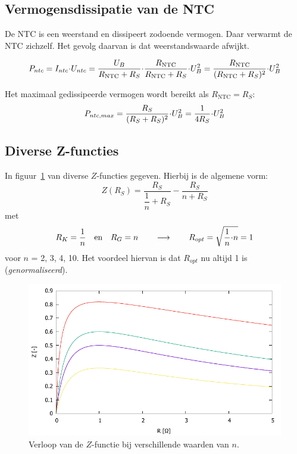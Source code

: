 \documentclass[12pt,a4paper,final,twoside,fleqn]{article}
\newcommand{\rntc}{R_\text{NTC}}
\newcommand{\ropt}{R_{opt}}
\let\oldcdot\cdot
\renewcommand{\cdot}{\kern-.10em\oldcdot\kern-.10em}
\begin{document}
\subsection{Vermogensdissipatie van de NTC}
De NTC is een weerstand en dissipeert zodoende vermogen. Daar verwarmt de NTC
zichzelf. Het gevolg daarvan is dat weerstandswaarde afwijkt.

\begin{equation}
P_{ntc} = I_{ntc}\cdot U_{ntc} = \dfrac{U_B}{\rntc+R_S}\cdot \dfrac{\rntc}{\rntc+R_S}\cdot U_B^2 =
\dfrac{\rntc}{(\rntc+R_S)^2}\cdot U_B^2
\end{equation} 

Het maximaal gedissipeerde vermogen wordt bereikt als $\rntc = R_S$:
\begin{equation}
P_{ntc,max} = \dfrac{R_S}{(R_S+R_S)^2}\cdot U_B^2 = \dfrac{1}{4R_S}\cdot U_B^2
\end{equation}


\subsection{Diverse Z-functies}
In figuur~\ref{fig:spanningsswings} van diverse $Z$-functies gegeven. Hierbij is
de algemene vorm:
\begin{equation}
Z(R_S) = \dfrac{R_S}{\dfrac{1}{n}+R_S} - \dfrac{R_S}{n+R_S}
\end{equation}
met
\begin{equation}
R_K = \dfrac{1}{n}\quad\text{en}\quad R_G = n \qquad\longrightarrow\qquad
\ropt = \sqrt{\dfrac{1}{n}\cdot n} = 1
\end{equation}
voor $n$ = 2, 3, 4, 10. Het voordeel hiervan is dat $\ropt$ nu altijd 1 is
(\textsl{genormaliseerd}).

\begin{figure}[ht!]
\centering
\includegraphics[scale=1]{gnuplot/spanningsswings}
\caption{Verloop van de $Z$-functie bij verschillende waarden van $n$.}
\label{fig:spanningsswings}
\end{figure}
 
\end{document}
